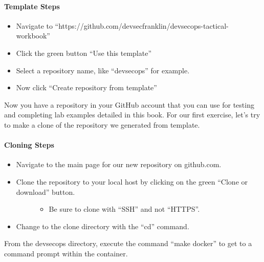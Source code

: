 \paragraph{Template Steps}
\begin{itemize}
      \item
            Navigate to ``https://github.com/devsecfranklin/devsecops-tactical-workbook''
      \item
            Click the green button ``Use this template''
      \item
            Select a repository name, like ``devsecops'' for
            example.
      \item
            Now click ``Create repository from template''
\end{itemize}

\justify{}
Now you have a repository in your GitHub account that you can use for
testing and completing lab examples detailed in this book. For our first
exercise, let's try to make a clone of the repository we generated from
template.


\paragraph{Cloning Steps}

\begin{itemize}
      \item
            Navigate to the main page for our new repository on github.com.
      \item
            \begin{description}
                  \item[Clone the repository to your local host by clicking on the green
                        ``Clone or download'' button.]
                        \begin{itemize}

                              \item
                                    Be sure to clone with ``SSH'' and not ``HTTPS''.
                        \end{itemize}
            \end{description}
      \item
            Change to the clone directory with the ``cd'' command.
\end{itemize}

\justify{}
From the devsecops directory, execute the command ``make docker'' to get to a command prompt within the container.

